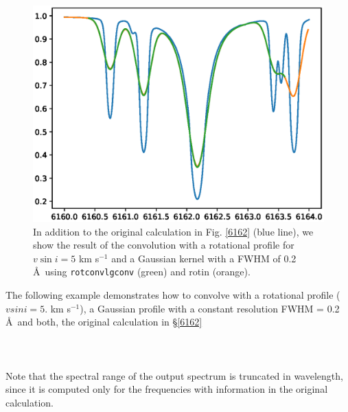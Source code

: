 \documentclass[]{article}
\begin{document}
\begin{figure}[t!]
\centering
\includegraphics[width=14cm]{Figure_4.ps}
\caption{In addition to the original calculation in Fig. \ref{6162} (blue line), we show the result of the convolution with a rotational profile for $v \sin i = 5$ km s$^{-1}$ and a Gaussian kernel with a FWHM of 0.2 \AA\ using {\tt rotconv}{\tt lgconv} (green) and rotin (orange).
\label{rotin}
}
\end{figure}


The following example demonstrates how to convolve with a rotational profile ($vsini = 5. $ km s$^{-1}$), a Gaussian profile with a constant resolution FWHM = 0.2 \AA\, and both, the original calculation in \S \ref{6162}
\\
\\
\\
\\

\noindent Note that the spectral range of the output spectrum is truncated in wavelength, since it is computed only for the frequencies with information in the original calculation. 
\end{document}
